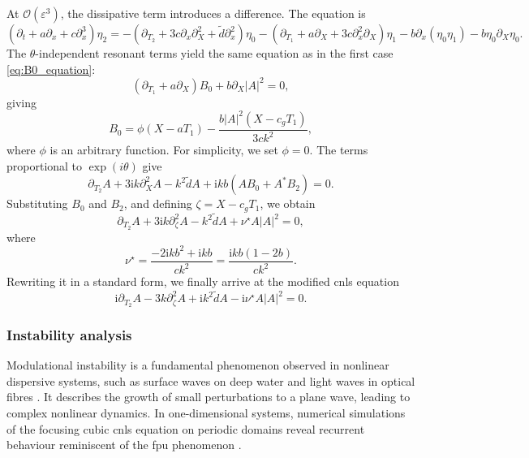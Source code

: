 \documentclass[alpha-refs, 12pt]{wiley-article}
\renewcommand{\O}{\mathcal{O}}
\newcommand{\ui}{\mathrm{i}}
\newcommand{\eps}{\varepsilon}
\begin{document}
At $\O(\eps^3)$, the dissipative term introduces a difference. The equation is
\begin{equation}\label{eq:third_order_intermediate}
  \left( \partial_t + a \partial_x + c \partial_x^3 \right) \eta_2 = - \left( \partial_{T_2} + 3 c \partial_x \partial_X^2 + \tilde{d} \partial_x^2 \right) \eta_0 - \left( \partial_{T_1} + a \partial_X + 3 c \partial_x^2 \partial_X \right) \eta_1 - b \partial_x ( \eta_0 \eta_1 ) - b \eta_0 \partial_X \eta_0.
\end{equation}
The $\theta$-independent resonant terms yield the same equation as in the first case \eqref{eq:B0_equation}:
\[
  \left( \partial_{T_1} + a \partial_X \right) B_0 + b \partial_X |A|^2 = 0,
\]
giving
\[
  B_0 = \phi(X - a T_1) - \frac{b |A|^2 (X - c_g T_1)}{3 c k^2},
\]
where $\phi$ is an arbitrary function. For simplicity, we set $\phi = 0$. The terms proportional to $\exp(i \theta)$ give
\begin{equation}\label{eq:resonant_theta_intermediate}
  \partial_{T_2} A + 3 \ui k \partial_X^2 A - k^2 \tilde{d} A + \ui k b \left( A B_0 + A^* B_2 \right) = 0.
\end{equation}
Substituting $B_0$ and $B_2$, and defining $\zeta = X - c_g T_1$, we obtain
\begin{equation*}%
  \partial_{T_2} A + 3 \ui k \partial_\zeta^2 A - k^2 \tilde{d} A + \nu^\star A |A|^2 = 0,
\end{equation*}
where
\[
  \nu^\star = \frac{-2 \ui k b^2 + \ui k b}{c k^2} = \frac{\ui k b (1 - 2 b)}{c k^2}.
\]
Rewriting it in a standard form, we finally arrive at the modified \acrfull{cnls} equation
\begin{equation}\label{eq:NLS_final_intermediate}
  \ui \partial_{T_2} A - 3 k \partial_\zeta^2 A + \ui k^2 \tilde{d} A - \ui \nu^\star A |A|^2 = 0.
\end{equation}

\subsubsection{Instability analysis}

Modulational instability is a fundamental phenomenon observed in nonlinear dispersive systems, such as surface waves on deep water \citep{Benjamin1967a, Yuen1975, Yuen1980, Remoissenet1996} and light waves in optical fibres \citep{Tai1986}. It describes the growth of small perturbations to a plane wave, leading to complex nonlinear dynamics. In one-dimensional systems, numerical simulations of the focusing cubic \acrfull{cnls} equation on periodic domains reveal recurrent behaviour reminiscent of the \acrfull{fpu} phenomenon \citep{Fermi1955, Yuen1978, Hafizi1981}.
\end{document}
